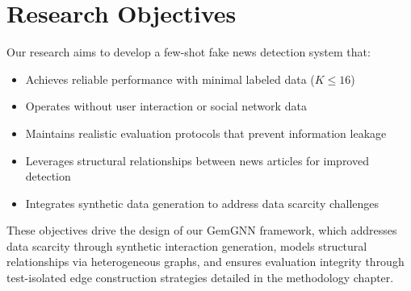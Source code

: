 \section{Research Objectives}

Our research aims to develop a few-shot fake news detection system that:

\begin{itemize}
\item Achieves reliable performance with minimal labeled data ($K \leq 16$)
\item Operates without user interaction or social network data
\item Maintains realistic evaluation protocols that prevent information leakage
\item Leverages structural relationships between news articles for improved detection
\item Integrates synthetic data generation to address data scarcity challenges
\end{itemize}

These objectives drive the design of our GemGNN framework, which addresses data scarcity through synthetic interaction generation, models structural relationships via heterogeneous graphs, and ensures evaluation integrity through test-isolated edge construction strategies detailed in the methodology chapter.

\EndChapter
